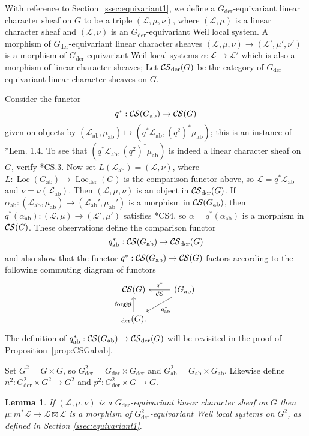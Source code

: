 \documentclass[10pt]{amsart}
\theoremstyle{plain}
\newtheorem{lemma}[theorem]{Lemma}
\theoremstyle{definition}
\DeclareMathOperator{\Loc}{Loc}
\newcommand{\der}{_{\operatorname{der}}}
\newcommand{\ab}{_{\operatorname{ab}}}
\newcommand{\cs}[1]{{\mathcal{#1}}}
\newcommand{\CS}{{\mathcal{C\hskip-0.8pt S}}}
\begin{document}
With reference to Section~\ref{ssec:equivariant1}, we define a $G\der$-equivariant linear character sheaf on $G$ to be a triple $(\cs{L},\mu, \nu)$, where $(\cs{L},\mu)$ is a linear character sheaf and $(\cs{L},\nu)$ is an $G\der$-equivariant Weil local system.  
A morphism of $G\der$-equivariant linear character sheaves $(\cs{L},\mu,\nu) \to (\cs{L}',\mu',\nu')$ is a morphism of $G\der$-equivariant Weil local systems $\alpha : \cs{L}\to \cs{L}'$ which is also a morphism of linear character sheaves; 
Let $\CS\der(G)$ be the category of $G\der$-equivariant linear character sheaves on $G$.

Consider the functor
\[
q^* : \CS(G\ab) \to \CS(G)
\]
given on objects by $(\cs{L}\ab,\mu\ab) \mapsto (q^*\cs{L}\ab, (q^2)^* \mu\ab)$; this is an instance of \cite{cunningham-roe:13a}*{Lem. 1.4}.
To see that $(q^*\cs{L}\ab, (q^2)^* \mu\ab)$ is indeed a linear character sheaf on $G$,
verify \cite{cunningham-roe:13a}*{CS.3}.
Now set $L(\cs{L}\ab) = (\cs{L},\nu)$, where $L : \Loc(G\ab) \to \Loc\der(G)$ is the comparison functor above, so $\cs{L} = q^*\cs{L}\ab$ and $\nu = \nu(\cs{L}\ab)$.
Then $(\cs{L}, \mu,\nu)$ is an object in $\CS\der(G)$.
If $\alpha\ab : (\cs{L}\ab,\mu\ab) \to (\cs{L}\ab',\mu\ab')$ is a morphism in $\CS(G\ab)$, 
then $q^*(\alpha\ab) : (\cs{L},\mu) \to (\cs{L}',\mu')$ satisfies \cite{cunningham-roe:13a}*{CS4}, so $\alpha = q^*(\alpha\ab)$ is a morphism in $\CS(G)$.
These observations define the comparison functor
\[
q\ab^* : \CS(G\ab) \to \CS\der(G)
\]
and also show that the functor $q^* : \CS(G\ab) \to \CS(G)$ factors according to the following commuting diagram of functors
\begin{equation}\label{qH}
\begin{tikzcd}
\CS(G) &\arrow{l}[swap]{q^*} 
\CS(G\ab) \arrow{dl}{q\ab^*}\\
\arrow{u}{\text{forget}} \CS\der(G). & 
\end{tikzcd}
\end{equation}
The definition of $q\ab^* : \CS(G\ab)\to \CS\der(G)$ will be revisited in the proof of Proposition~\ref{prop:CSGabab}.



Set $G^2 = G\times G$, so $G^2\der = G\der\times G\der$ and $G^2\ab = G\ab\times G\ab$.
Likewise define $n^2 : G\der^2 \times G^2 \to G^2$ and $p^2 : G\der^2\times G \to G$.


\begin{lemma}\label{lem:HH}
If $(\cs{L},\mu,\nu)$ is a $G\der$-equivariant linear character sheaf on $G$ then $\mu : m^*\cs{L} \to \cs{L}\boxtimes \cs{L}$ 
is a morphism of $G^2\der$-equivariant Weil local systems on $G^2$, as defined in Section \ref{ssec:equivariant1}.
\end{lemma}
\end{document}
